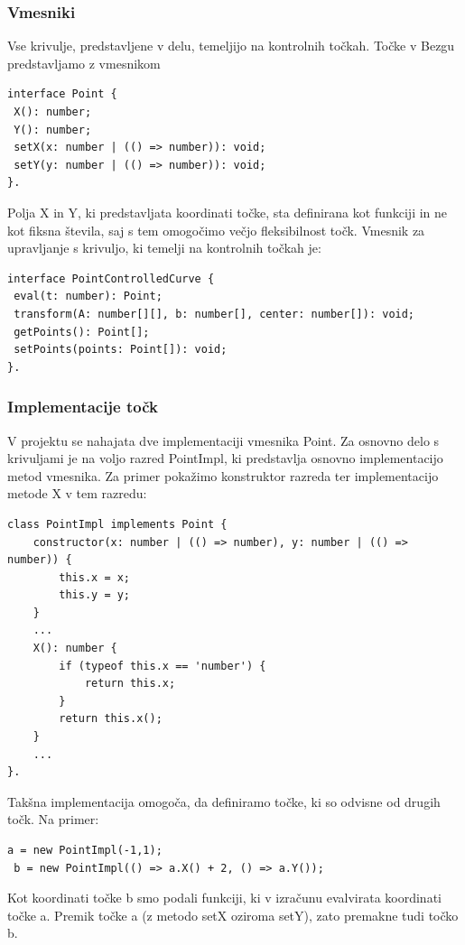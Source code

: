\documentclass[isrm2, tisk]{fmfdelo}
\begin{document}
    \subsubsection{Vmesniki}\label{subsubsec:osnovni-vmesniki}
    Vse krivulje, predstavljene v delu, temeljijo na kontrolnih točkah.
    Točke v Bezgu predstavljamo z vmesnikom
    \begin{lstlisting}[label={lst:vmesnik-tocke}]
interface Point {
 X(): number;
 Y(): number;
 setX(x: number | (() => number)): void;
 setY(y: number | (() => number)): void;
}.
    \end{lstlisting}
    Polja X in Y, ki predstavljata koordinati točke, sta definirana kot funkciji in ne kot fiksna števila, saj s tem omogočimo večjo fleksibilnost točk.
    Vmesnik za upravljanje s krivuljo, ki temelji na kontrolnih točkah je:
    \begin{lstlisting}[label={lst:vmesnik-curve}]
interface PointControlledCurve {
 eval(t: number): Point;
 transform(A: number[][], b: number[], center: number[]): void;
 getPoints(): Point[];
 setPoints(points: Point[]): void;
}.
    \end{lstlisting}

    \subsubsection{Implementacije točk}
    V projektu se nahajata dve implementaciji vmesnika Point.
    Za osnovno delo s krivuljami je na voljo razred PointImpl, ki predstavlja osnovno implementacijo metod vmesnika.
    Za primer pokažimo konstruktor razreda ter implementacijo metode X v tem razredu:
    \begin{lstlisting}[label={lst:point-impl}]
class PointImpl implements Point {
    constructor(x: number | (() => number), y: number | (() => number)) {
        this.x = x;
        this.y = y;
    }
    ...
    X(): number {
        if (typeof this.x == 'number') {
            return this.x;
        }
        return this.x();
    }
    ...
}.
    \end{lstlisting}
    Takšna implementacija omogoča, da definiramo točke, ki so odvisne od drugih točk.
    Na primer:
    \begin{lstlisting}[label={lst:jsx-point-impl}]
 a = new PointImpl(-1,1);
 b = new PointImpl(() => a.X() + 2, () => a.Y());
    \end{lstlisting}
    Kot koordinati točke b smo podali funkciji, ki v izračunu evalvirata koordinati točke a.
    Premik točke a (z metodo setX oziroma setY), zato premakne tudi točko b.
\end{document}
